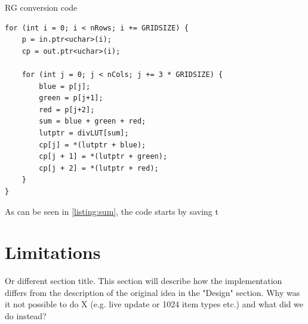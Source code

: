 \begin{listing}[H]
	\caption{RG conversion code}
	\label{listing:sum}
	\begin{verbatim}
for (int i = 0; i < nRows; i += GRIDSIZE) {
	p = in.ptr<uchar>(i);
	cp = out.ptr<uchar>(i);
	
	for (int j = 0; j < nCols; j += 3 * GRIDSIZE) {
		blue = p[j];
		green = p[j+1];
		red = p[j+2];
		sum = blue + green + red;
		lutptr = divLUT[sum];
		cp[j] = *(lutptr + blue);
		cp[j + 1] = *(lutptr + green);
		cp[j + 2] = *(lutptr + red);
	}
}
	\end{verbatim}
\end{listing}
As can be seen in \ref{listing:sum}, the code starts by saving t

\section{Limitations}
Or different section title. This section will describe how the implementation differs from the description of the original idea in the "Design" section. Why was it not possible to do X (e.g. live update or 1024 item types etc.) and what did we do instead?